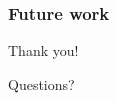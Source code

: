     \begin{frame}
        \frametitle{Future work}
    \end{frame}


    \begin{frame}[plain]
        \begin{center}
            \par{\Huge{Thank you!}}
            \vspace{2.0cm}
            \par{\Huge{Questions?}}
        \end{center}
    \end{frame}
